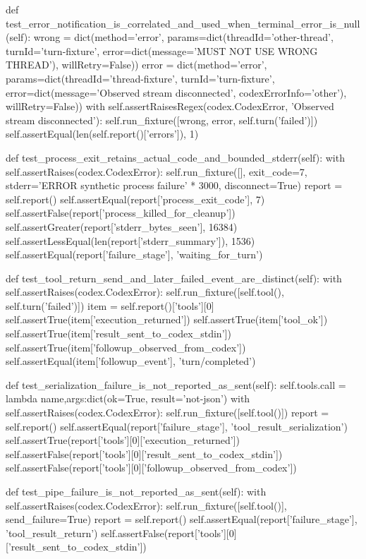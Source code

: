     def test_error_notification_is_correlated_and_used_when_terminal_error_is_null(self):
        wrong = dict(method='error', params=dict(threadId='other-thread', turnId='turn-fixture',
                     error=dict(message='MUST NOT USE WRONG THREAD'), willRetry=False))
        error = dict(method='error', params=dict(threadId='thread-fixture', turnId='turn-fixture',
                     error=dict(message='Observed stream disconnected', codexErrorInfo='other'), willRetry=False))
        with self.assertRaisesRegex(codex.CodexError, 'Observed stream disconnected'):
            self.run_fixture([wrong, error, self.turn('failed')])
        self.assertEqual(len(self.report()['errors']), 1)

    def test_process_exit_retains_actual_code_and_bounded_stderr(self):
        with self.assertRaises(codex.CodexError):
            self.run_fixture([], exit_code=7, stderr='ERROR synthetic process failure\n' * 3000, disconnect=True)
        report = self.report()
        self.assertEqual(report['process_exit_code'], 7)
        self.assertFalse(report['process_killed_for_cleanup'])
        self.assertGreater(report['stderr_bytes_seen'], 16384)
        self.assertLessEqual(len(report['stderr_summary']), 1536)
        self.assertEqual(report['failure_stage'], 'waiting_for_turn')

    def test_tool_return_send_and_later_failed_event_are_distinct(self):
        with self.assertRaises(codex.CodexError):
            self.run_fixture([self.tool(), self.turn('failed')])
        item = self.report()['tools'][0]
        self.assertTrue(item['execution_returned'])
        self.assertTrue(item['tool_ok'])
        self.assertTrue(item['result_sent_to_codex_stdin'])
        self.assertTrue(item['followup_observed_from_codex'])
        self.assertEqual(item['followup_event'], 'turn/completed')

    def test_serialization_failure_is_not_reported_as_sent(self):
        self.tools.call = lambda name,args:dict(ok=True, result={'not-json'})
        with self.assertRaises(codex.CodexError):
            self.run_fixture([self.tool()])
        report = self.report()
        self.assertEqual(report['failure_stage'], 'tool_result_serialization')
        self.assertTrue(report['tools'][0]['execution_returned'])
        self.assertFalse(report['tools'][0]['result_sent_to_codex_stdin'])
        self.assertFalse(report['tools'][0]['followup_observed_from_codex'])

    def test_pipe_failure_is_not_reported_as_sent(self):
        with self.assertRaises(codex.CodexError):
            self.run_fixture([self.tool()], send_failure=True)
        report = self.report()
        self.assertEqual(report['failure_stage'], 'tool_result_return')
        self.assertFalse(report['tools'][0]['result_sent_to_codex_stdin'])

